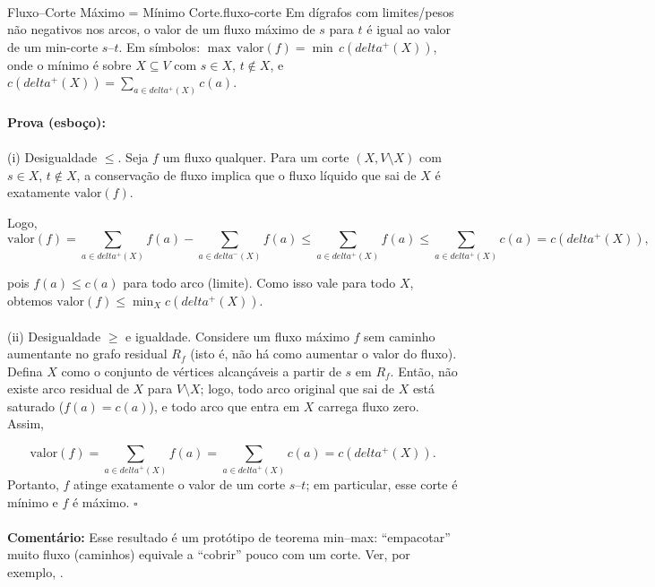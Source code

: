 \documentclass[12pt,a4paper]{article}
\def\emph#1{#1}%
\def\delta{delta}%
\begin{document}
\paragraph{}
\begin{teobox}{Fluxo–Corte Máximo = Mínimo Corte.}{fluxo-corte}
    Em dígrafos com limites/pesos não negativos nos arcos, o valor de um fluxo máximo de \(s\) para \(t\) é igual ao valor de um min-corte \(s\text{--}t\). Em símbolos: \(\max\,\text{valor}(f) = \min\, c(\delta^+(X))\), onde o mínimo é sobre \(X\subseteq V\) com \(s\in X\), \(t\notin X\), e \(c(\delta^+(X))=\sum_{a\in\delta^+(X)} c(a)\).
    \paragraph{}
    \textbf{Prova (esboço):}
    \paragraph{}
    \emph{(i) Desigualdade \(\le\).} Seja \(f\) um fluxo qualquer. Para um corte \((X, V\setminus X)\) com \(s\in X\), \(t\notin X\), a conservação de fluxo implica que o fluxo líquido que sai de \(X\) é exatamente \(\text{valor}(f)\).

    Logo, \[\text{valor}(f)= \sum_{a\in\delta^+(X)} f(a) - \sum_{a\in\delta^-(X)} f(a) \le \sum_{a\in\delta^+(X)} f(a) \le \sum_{a\in\delta^+(X)} c(a)=c(\delta^+(X)),\]

    pois \(f(a)\le c(a)\) para todo arco (limite). Como isso vale para todo \(X\), obtemos \(\text{valor}(f)\le \min_X c(\delta^+(X))\).

    \paragraph{}
    \emph{(ii) Desigualdade \(\ge\) e igualdade.} Considere um fluxo máximo \(f\) sem caminho aumentante no \emph{grafo residual} \(R_f\) (isto é, não há como aumentar o valor do fluxo). Defina \(X\) como o conjunto de vértices alcançáveis a partir de \(s\) em \(R_f\). Então, não existe arco residual de \(X\) para \(V\setminus X\); logo, todo arco original que sai de \(X\) está saturado (\(f(a)=c(a)\)), e todo arco que entra em \(X\) carrega fluxo zero. Assim,

    \[\text{valor}(f)=\sum_{a\in\delta^+(X)} f(a)=\sum_{a\in\delta^+(X)} c(a)=c(\delta^+(X)).\]
    Portanto, \(f\) atinge exatamente o valor de um corte \(s\text{--}t\); em particular, esse corte é mínimo e \(f\) é máximo. \hfill$\square$

    \paragraph{}
    \smallskip
    \textbf{Comentário:} Esse resultado é um protótipo de teorema \emph{min--max}: “empacotar” muito fluxo (caminhos) equivale a “cobrir” pouco com um corte. Ver, por exemplo, \cite{schrijver2003comb}.
\end{teobox}
\end{document}
